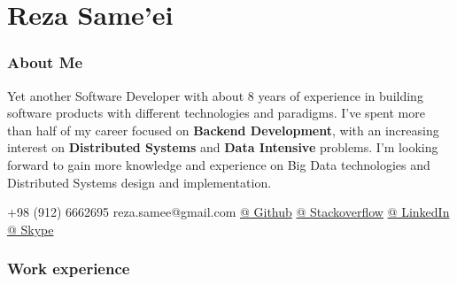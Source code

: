 \documentclass{tccv}
\begin{document}
\part{Reza Same'ei}

\section{About Me}
Yet another Software Developer with about 8 years of experience in building software products with different technologies and paradigms. I’ve spent more than half of my career focused on ​\textbf{Backend Development}​, with an increasing interest on \textbf{Distributed Systems} and ​\textbf{Data Intensive} problems. I’m looking forward to gain more knowledge and experience on Big Data technologies and Distributed Systems design and implementation.

  {+98 (912) 6662695}
  {reza.samee@gmail.com}
  {\href{https://github.com/sameei}{@ Github}}
  {\href{https://stackoverflow.com/users/998642/reza-sameei}{@ Stackoverflow}}
  {\href{http://linkedin.com/in/reza-sameei/}{@ LinkedIn}}
  {\href{https://join.skype.com/invite/nINGOAMPxZdX}{@ Skype}}

\section{Work experience}
\end{document}
